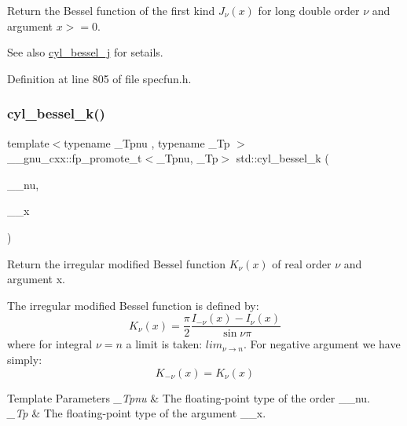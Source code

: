 Return the Bessel function of the first kind $ J_{\nu}(x) $ for {\ttfamily long double} order $ \nu $ and argument $ x >= 0 $.

\begin{DoxySeeAlso}{See also}
\hyperlink{group__mathsf__std_ga644f7eb975809674db88768f2f115744}{cyl\+\_\+bessel\+\_\+j} for setails. 
\end{DoxySeeAlso}


Definition at line 805 of file specfun.\+h.

\mbox{\label{group__mathsf__std_gac73d664b8e7ceba7f8e786c93e97a084}} 
\subsubsection{\texorpdfstring{cyl\+\_\+bessel\+\_\+k()}{cyl\_bessel\_k()}}
{\footnotesize\ttfamily template$<$typename \+\_\+\+Tpnu , typename \+\_\+\+Tp $>$ \\
\+\_\+\+\_\+gnu\+\_\+cxx\+::fp\+\_\+promote\+\_\+t$<$\+\_\+\+Tpnu, \+\_\+\+Tp$>$ std\+::cyl\+\_\+bessel\+\_\+k (\begin{DoxyParamCaption}\item[{\+\_\+\+Tpnu}]{\+\_\+\+\_\+nu,  }\item[{\+\_\+\+Tp}]{\+\_\+\+\_\+x }\end{DoxyParamCaption})\hspace{0.3cm}{\ttfamily [inline]}}

Return the irregular modified Bessel function $ K_{\nu}(x) $ of real order $ \nu $ and argument {\ttfamily x}.

The irregular modified Bessel function is defined by\+: \[ K_{\nu}(x) = \frac{\pi}{2} \frac{I_{-\nu}(x) - I_{\nu}(x)}{\sin \nu\pi} \] where for integral $ \nu = n $ a limit is taken\+: $ lim_{\nu \to n} $. For negative argument we have simply\+: \[ K_{-\nu}(x) = K_{\nu}(x) \]


\begin{DoxyTemplParams}{Template Parameters}
{\em \+\_\+\+Tpnu} & The floating-\/point type of the order {\ttfamily \+\_\+\+\_\+nu}. \\
\hline
{\em \+\_\+\+Tp} & The floating-\/point type of the argument {\ttfamily \+\_\+\+\_\+x}. \\
\hline
\end{DoxyTemplParams}

